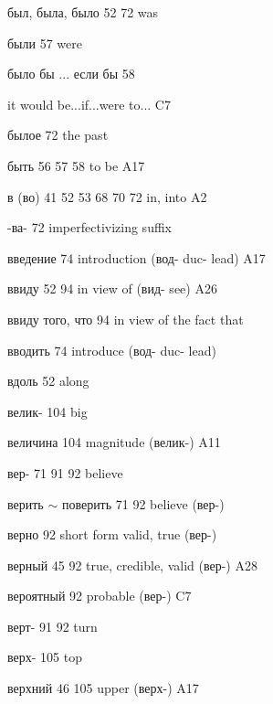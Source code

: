 \begin{minipage}[t]{0.475\textwidth}
\raggedright
\noindent был, была, было 52 72 was\par
\noindent были 57 were\par
\noindent было бы ... если бы 58\par
\noindent it would be...if...were to... C7\par
\noindent былое 72 the past\par
\noindent быть 56 57 58 to be A17\par
\noindent в (во) 41 52 53 68 70 72 in, into A2\par
\noindent -ва- 72 imperfectivizing suffix \par
\noindent введение 74 introduction (вод- duc- lead) A17\par
\noindent ввиду 52 94 in view of (вид- see) A26\par
\noindent ввиду того, что 94 in view of the fact that\par
\noindent вводить 74 introduce (вод- duc- lead)\par
\noindent вдоль 52 along\par
\noindent велик- 104 big\par
\noindent величина 104 magnitude (велик-) A11\par
\noindent вер- 71 91 92 believe\par
\noindent верить $\sim$ поверить 71 92 believe (вер-)\par
\noindent верно 92 short form valid, true (вер-)\par
\noindent верный 45 92 true, credible, valid (вер-) A28\par
\noindent вероятный 92 probable (вер-) C7\par
\noindent верт- 91 92 turn\par
\noindent верх- 105 top\par
\noindent верхний 46 105 upper (верх-) A17\par
\end{minipage}
\endgroup

